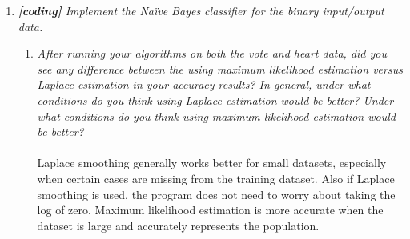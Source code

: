 \documentclass{article} %
\begin{document}
\begin{enumerate}
	\item \textit{\textbf{[coding]} Implement the Na\"ive Bayes classifier for the binary input/output data.}
	\begin{enumerate}
	\item \textit{After running your algorithms on both the vote and heart data, did you see any difference between the using maximum likelihood estimation versus Laplace estimation in your accuracy results? In general, under what conditions do you think using Laplace estimation would be better? Under what conditions do you think using maximum likelihood estimation would be better?}\\
	\\
	Laplace smoothing generally works better for small datasets, especially when certain cases are missing from the training dataset. Also if Laplace smoothing is used, the program does not need to worry about taking the log of zero. Maximum likelihood estimation is more accurate when the dataset is large and accurately represents the population.	
	
	\end{enumerate}

\end{enumerate}
\end{document}

